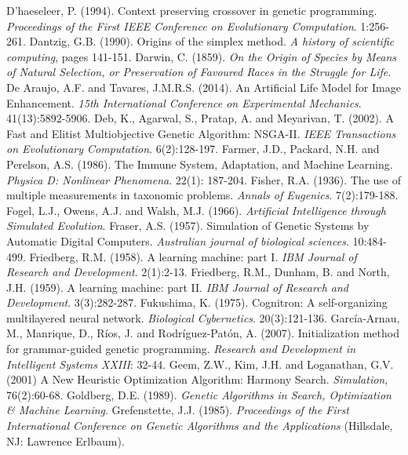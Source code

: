 \documentclass[spanish,a4paper,12pt,twoside]{report}
\begin{document}
\begin{thebibliography}{00}
   D'haeseleer, P. (1994). Context preserving crossover in genetic programming. \emph{Proceedings of the First IEEE Conference on Evolutionary Computation}. 1:256-261.
   Dantzig, G.B. (1990). Origins of the simplex method. \emph{A history of scientific computing}, pages 141-151.
   Darwin, C. (1859). \emph{On the Origin of Species by Means of Natural Selection, or Preservation of Favoured Races in the Struggle for Life}. 
   De Araujo, A.F. and Tavares, J.M.R.S. (2014). An Artificial Life Model for Image Enhancement. \emph{15th International Conference on Experimental Mechanics}. 41(13):5892-5906.
   Deb, K., Agarwal, S., Pratap, A. and Meyarivan, T. (2002). A Fast and Elitist Multiobjective Genetic Algorithm: NSGA-II. \emph{IEEE Transactions on Evolutionary Computation}. 6(2):128-197.
   Farmer, J.D., Packard, N.H. and Perelson, A.S. (1986). The Immune System, Adaptation, and Machine Learning. \emph{Physica D: Nonlinear Phenomena}. 22(1): 187-204.
   Fisher, R.A. (1936). The use of multiple measurements in taxonomic problems. \emph{Annals of Eugenics}. 7(2):179-188.
   Fogel, L.J., Owens, A.J. and Walsh, M.J. (1966). \emph{Artificial Intelligence through Simulated Evolution}.
   Fraser, A.S. (1957). Simulation of Genetic Systems by Automatic Digital Computers. \emph{Australian journal of biological sciences}. 10:484-499.
   Friedberg, R.M. (1958). A learning machine: part I. \emph{IBM Journal of Research and Development}. 2(1):2-13.
   Friedberg, R.M., Dunham, B. and North, J.H. (1959). A learning machine: part II. \emph{IBM Journal of Research and Development}. 3(3):282-287.
   Fukushima, K. (1975). Cognitron: A self-organizing multilayered neural network. \emph{Biological Cybernetics}. 20(3):121-136.
   García-Arnau, M., Manrique, D., Ríos, J. and Rodríguez-Patón, A. (2007). Initialization method for grammar-guided genetic programming. \emph{Research and Development in Intelligent Systems XXIII}: 32-44.
   Geem, Z.W., Kim, J.H. and Loganathan, G.V. (2001) A New Heuristic Optimization Algorithm: Harmony Search. \emph{Simulation}, 76(2):60-68.
   Goldberg, D.E. (1989). \emph{Genetic Algorithms in Search, Optimization \& Machine Learning}.
   Grefenstette, J.J. (1985). \emph{Proceedings of the First International Conference on Genetic Algorithms and the Applications} (Hillsdale, NJ: Lawrence Erlbaum).

\end{thebibliography}
\end{document}
